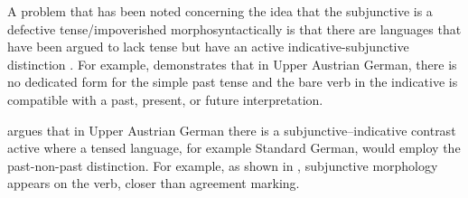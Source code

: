 \documentclass[output=paper,
modfonts,
newtxmath,
hidelinks,
]{langscibook}
\begin{document}
A problem that has been noted concerning the idea that the subjunctive is a defective tense/impoverished morphosyntactically is that there are languages that have been argued to lack tense but have an active indicative-subjunctive distinction \citep{Wiltschko}. For example, \citet{Wiltschko} demonstrates that in Upper Austrian German, there is no dedicated form for the simple past tense and the bare verb in the indicative is compatible with a past, present, or future interpretation.

\ea \label{10:ex19}
	\z
\z

\noindent \citet{Wiltschko} argues that in Upper Austrian German there is a subjunctive--indicative contrast active where a tensed language, for example Standard German, would employ the past-non-past distinction. For example, as shown in , subjunctive morphology appears on the verb, closer than agreement marking.

\ea \label{10:ex20}
	\z
\z
\end{document}
